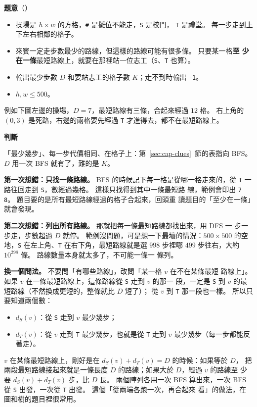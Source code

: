 \textbf{題意}（）

\begin{itemize}
\item 操場是 $h \times w$ 的方格，\texttt{\#} 是攤位不能走，\texttt{S} 是校門，
\texttt{T} 是禮堂。 每一步走到上下左右相鄰的格子。
\item 來賓一定走步數最少的路線，但這樣的路線可能有很多條。 只要某一格\textbf{至
少在一條}最短路線上，就要在那裡站一位志工（\texttt{S}、\texttt{T} 也算）。
\item 輸出最少步數 $D$ 和要站志工的格子數 $K$；走不到時輸出 \texttt{-1}。
\item $h, w \le 500$。
\end{itemize}

例如下圖左邊的操場，$D = 7$，最短路線有三條，合起來經過 $12$ 格。 右上角的
$(0, 3)$ 是死路，右邊的兩格要先經過 \texttt{T} 才進得去，都不在最短路線上。

\textbf{判斷}

「最少幾步」、每一步代價相同、在格子上：第~\ref{sec:cap-clues}~節的表指向
BFS。 $D$ 用一次 BFS 就有了，難的是 $K$。

\textbf{第一次想錯：只找一條路線。} BFS 的時候記下每一格是從哪一格走來的，從
\texttt{T} 一路往回走到 \texttt{S}，數經過幾格。 這樣只找得到其中一條最短路
線，範例會印出 \texttt{7 8}。 題目要的是所有最短路線經過的格子合起來，回頭重
讀題目的「至少在一條」就會發現。

\textbf{第二次想錯：列出所有路線。} 那就把每一條最短路線都找出來，用 DFS 一
步一步走，步數超過 $D$ 就停。 範例沒問題，可是想一下最壞的情況：$500 \times
500$ 的空地，\texttt{S} 在左上角、\texttt{T} 在右下角，最短路線就是選 $998$
步裡哪 $499$ 步往右，大約 $10^{298}$ 條。 路線數量本身就太多了，不可能一條一
條列。

\textbf{換一個問法。} 不要問「有哪些路線」，改問「某一格 $v$ 在不在某條最短
路線上」。 如果 $v$ 在一條最短路線上，這條路線從 \texttt{S} 走到 $v$ 的那一
段，一定是 \texttt{S} 到 $v$ 的最短路線（不然換成更短的，整條就比 $D$ 短了）；
從 $v$ 到 \texttt{T} 那一段也一樣。 所以只要知道兩個數：

\begin{itemize}
\item $d_S(v)$：從 \texttt{S} 走到 $v$ 最少幾步；
\item $d_T(v)$：從 $v$ 走到 \texttt{T} 最少幾步，也就是從 \texttt{T} 走到 $v$
最少幾步（每一步都能反著走）。
\end{itemize}

$v$ 在某條最短路線上，剛好是在 $d_S(v) + d_T(v) = D$ 的時候：如果等於 $D$，
把兩段最短路線接起來就是一條長度 $D$ 的路線；如果大於 $D$，經過 $v$ 的路線至
少要 $d_S(v) + d_T(v)$ 步，比 $D$ 長。 兩個陣列各用一次 BFS 算出來，一次 BFS
從 \texttt{S} 出發，一次從 \texttt{T} 出發。 這個「從兩端各跑一次，再合起來
看」的做法，在圖和樹的題目裡很常用。

